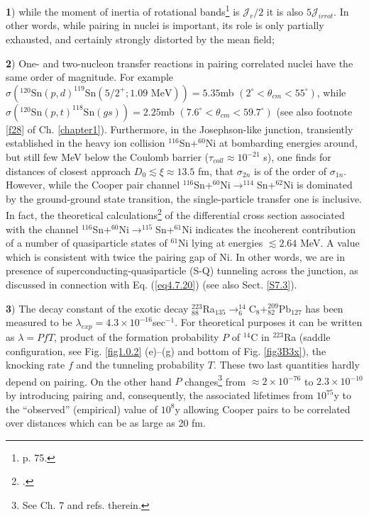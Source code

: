   \textbf{1}) while the moment of inertia of rotational bands\footnote{\cite{Bohr:75} p. 75.} is $\mathcal J_r/2$ it is also $5 \mathcal J_{irrot}$. In other words, while pairing in nuclei is important, its role is only partially exhausted, and certainly strongly distorted by the mean field; 
  
  \textbf{2}) One- and two-nucleon transfer reactions in pairing correlated nuclei have the same order of magnitude. 
   For example $\sigma (^{120}\text{Sn}(p,d)^{119}\text{Sn}(5/2^+; 1.09 \text{ MeV}))=5.35 $mb $(2^\circ<\theta_{cm}<55^\circ)$, while $\sigma (^{120}\text{Sn}(p,t)^{118}\text{Sn}(gs))=2.25 $mb $(7.6^\circ<\theta_{cm}<59.7^\circ)$ (see also footnote \ref{f28} of  Ch. \ref{chapter1}). Furthermore, in the Josephson-like junction, transiently established in the heavy ion collision $^{116}$Sn+$^{60}$Ni at bombarding energies around, but still few MeV below the Coulomb barrier ($\tau_{coll}\approx10^{-21}$ s), one finds for distances of closest approach $D_0\lesssim\xi\approx13.5$ fm, that $\sigma_{2n}$ is of the order of $\sigma_{1n}$. However, while the Cooper pair channel $^{116}$Sn+$^{60}$Ni$\to^{114}$Sn+$^{62}$Ni is dominated by the ground-ground state transition, the single-particle transfer one is inclusive. In fact, the theoretical calculations\footnote{\cite{Montanari:14,Potel:21}.} of the differential cross section  associated with the channel $^{116}$Sn+$^{60}$Ni$\to^{115}$Sn+$^{61}$Ni indicates the incoherent contribution of a number of quasiparticle states of $^{61}$Ni lying at energies $\lesssim2.64$ MeV. A value which is consistent with twice the pairing gap of Ni. In other words, we are in presence of superconducting-quasiparticle (S-Q) tunneling across the junction, as discussed in connection with Eq. (\ref{eq4.7.20}) (see also Sect. \ref{S7.3}).
  
  
   \textbf{3}) The decay constant of the exotic decay $^{223}_{88}$Ra$_{135}\rightarrow^{14}_6$C$_8+^{209}_{82}$Pb$_{127}$ has been measured to be $\lambda_{exp}=4.3\times10^{-16}$sec$^{-1}$. For theoretical purposes it can be written as $\lambda=PfT$, product of the formation probability $P$ of $^{14}$C in $^{223}$Ra (saddle configuration, see Fig. \ref{fig1.0.2} (e)--(g) and bottom of Fig. \ref{fig3B3x}), the knocking rate $f$ and the tunneling probability $T$. These two last quantities hardly depend on pairing. On the other hand $P$ changes\footnote{See \cite{Brink:05} Ch. 7 and refs. therein.} from $\approx 2\times10^{-76}$ to $2.3\times10^{-10}$ by introducing pairing and, consequently, the associated lifetimes from $10^{75}$y to the ``observed'' (empirical) value of $10^8$y  allowing Cooper pairs to be correlated over distances which can be as large as 20 fm.
 
